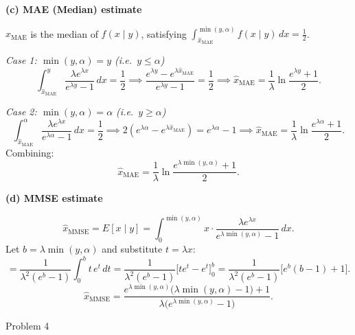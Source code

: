 \documentclass[12pt,a4paper,onecolumn]{exam}
\newcommand{\questionheader}[1]{%
  \begin{tcolorbox}[
    enhanced,
    colback=black,
    coltext=white,
    boxrule=0pt,
    fontupper=\Large\bfseries,
    arc=4mm
  ]
  #1
  \end{tcolorbox}%
}
\begin{document}
\begin{solution}
\textbf{(c) MAE (Median) estimate}

$\hat{x}_{\mathrm{MAE}}$ is the median of $f(x\mid y)$, satisfying $\int_{\hat{x}_{\mathrm{MAE}}}^{\min(y,\alpha)} f(x\mid y)\,dx = \tfrac{1}{2}$.

\textit{Case 1: $\min(y,\alpha) = y$ (i.e.\ $y \leq \alpha$)}
\[
  \int_{\hat{x}_{\mathrm{MAE}}}^{y} \frac{\lambda e^{\lambda x}}{e^{\lambda y}-1}\,dx = \frac{1}{2}
  \implies \frac{e^{\lambda y} - e^{\lambda\hat{x}_{\mathrm{MAE}}}}{e^{\lambda y}-1} = \frac{1}{2}
  \implies \hat{x}_{\mathrm{MAE}} = \frac{1}{\lambda}\ln\frac{e^{\lambda y}+1}{2}.
\]

\textit{Case 2: $\min(y,\alpha) = \alpha$ (i.e.\ $y \geq \alpha$)}
\[
  \int_{\hat{x}_{\mathrm{MAE}}}^{\alpha} \frac{\lambda e^{\lambda x}}{e^{\lambda\alpha}-1}\,dx = \frac{1}{2}
  \implies 2(e^{\lambda\alpha} - e^{\lambda\hat{x}_{\mathrm{MAE}}}) = e^{\lambda\alpha}-1
  \implies \hat{x}_{\mathrm{MAE}} = \frac{1}{\lambda}\ln\frac{e^{\lambda\alpha}+1}{2}.
\]
Combining:
\[
  \boxed{\hat{x}_{\mathrm{MAE}} = \frac{1}{\lambda}\ln\frac{e^{\lambda\min(y,\alpha)}+1}{2}.}
\]

\textbf{(d) MMSE estimate}

\[
  \hat{x}_{\mathrm{MMSE}} = E[x \mid y]
    = \int_0^{\min(y,\alpha)} x \cdot \frac{\lambda e^{\lambda x}}{e^{\lambda\min(y,\alpha)}-1}\,dx.
\]
Let $b = \lambda\min(y,\alpha)$ and substitute $t = \lambda x$:
\[
  = \frac{1}{\lambda^2(e^b-1)}\int_0^b t\,e^t\,dt
  = \frac{1}{\lambda^2(e^b-1)}\bigl[te^t - e^t\bigr]_0^b
  = \frac{1}{\lambda^2(e^b-1)}\bigl[e^b(b-1)+1\bigr].
\]
\[
  \boxed{\hat{x}_{\mathrm{MMSE}} = \frac{e^{\lambda\min(y,\alpha)}\bigl(\lambda\min(y,\alpha)-1\bigr)+1}{\lambda\bigl(e^{\lambda\min(y,\alpha)}-1\bigr)}.}
\]

\end{solution}

\questionheader{Problem 4}
\end{document}
